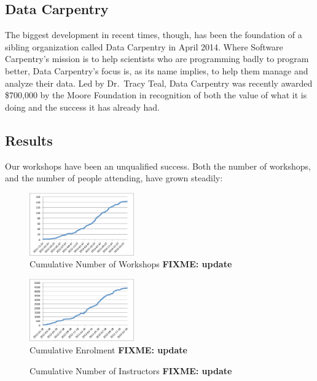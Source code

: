 \documentclass[10pt,a4paper,twocolumn]{article}
\newcommand{\fixme}[1]{\bf{FIXME: {#1}}}
\begin{document}
\subsection*{Data Carpentry}

The biggest development in recent times, though, has been the
foundation of a sibling organization called Data Carpentry in April
2014.  Where Software Carpentry's mission is to help scientists who
are programming badly to program better, Data Carpentry's focus is, as
its name implies, to help them manage and analyze their data.  Led by
Dr.\ Tracy Teal, Data Carpentry was recently awarded \$700,000 by the
Moore Foundation in recognition of both the value of what it is doing
and the success it has already had.

\subsection*{Results}

Our workshops have been an unqualified success. Both the number
of workshops, and the number of people attending, have grown steadily:

\begin{figure}
\centering
\includegraphics[width=0.4\textwidth]{workshops.pdf}
\caption{Cumulative Number of Workshops \fixme{update}}
\label{f:workshops}
\end{figure}

\begin{figure}
\centering
\includegraphics[width=0.4\textwidth]{enrolment.pdf}
\caption{Cumulative Enrolment \fixme{update}}
\label{f:enrolment}
\end{figure}

\begin{figure}
\centering
\caption{Cumulative Number of Instructors \fixme{update}}
\label{f:instructors}
\end{figure}
\end{document}
